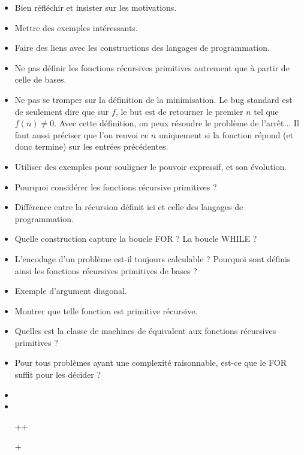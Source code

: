 \documentclass{agregfiche}
\begin{document}
\begin{itemize}
    \item Bien réfléchir et insister sur les motivations.
	\item Mettre des exemples intéressants.
    \item Faire des liens avec les constructions des langages de programmation.
	\item Ne pas définir les fonctions récursives primitives autrement que à partir de celle de bases.
    \item Ne pas se tromper sur la définition de la minimisation. Le bug standard est de seulement dire que sur $f$, le but est de retourner le premier $n$ tel que $f(n) \neq 0$. Avec cette définition, on peux résoudre le problème de l'arrêt... Il faut aussi préciser que l'on renvoi ce $n$ uniquement si la fonction répond (et donc termine) sur les entrées précédentes.
    \item Utiliser des exemples pour souligner le pouvoir expressif, et son évolution.
\end{itemize}

\secquestionsclassiques

\begin{itemize}
	\item Pourquoi considérer les fonctions récursive primitives ? %
	\item Différence entre la récursion définit ici et celle des langages de programmation.
    \item Quelle construction capture la boucle FOR ? La boucle WHILE ?
	\item L'encodage d'un problème est-il toujours calculable ? Pourquoi sont définis ainsi les fonctions récursives primitives de bases ?
	\item Exemple d'argument diagonal.
	\item Montrer que telle fonction est primitive récursive.
    \item Quelles est la classe de machines de  équivalent aux fonctions récursives primitives ? %
    \item Pour tous problèmes ayant une complexité raisonnable, est-ce que le FOR suffit pour les décider ?	
\end{itemize}

\secreferences

\begin{itemize}
\item 
\item 
\end{itemize}

\secdev

\begin{itemize}
    \item[++]  
    \item[+] 
\end{itemize}
\end{document}
